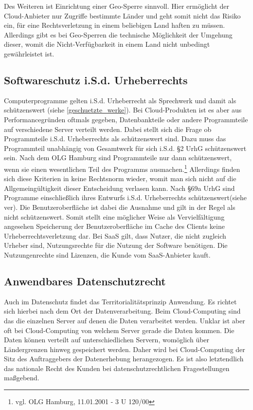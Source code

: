 Des Weiteren ist Einrichtung einer Geo-Sperre sinnvoll. Hier erm\"oglicht der Cloud-Anbieter nur Zugriffe bestimmte L\"ander und geht somit nicht das Risiko ein, f\"ur eine Rechtsverletzung in einem beliebigen Land haften zu m\"ussen. Allerdings gibt es bei Geo-Sperren die technische M\"oglichkeit der Umgehung dieser, womit die Nicht-Verf\"ugbarkeit in einem Land nicht unbedingt gew\"ahrleistet ist.

 \subsection{Softwareschutz i.S.d. Urheberrechts}
Computerprogramme gelten i.S.d. Urheberrecht als Sprechwerk und damit als sch\"utzenswert (siehe \vref{geschuetzte_werke}). Bei Cloud-Produkten ist es aber aus Performancegr\"unden oftmals gegeben, Datenbankteile oder andere Programmteile auf verschiedene Server verteilt werden. Dabei stellt sich die Frage ob Programmteile i.S.d. Urheberrechts als sch\"utzenswert sind. Dazu muss das Programmteil unabh\"angig von Gesamtwerk f\"ur sich i.S.d. §2 UrhG sch\"utzenswert sein. Nach dem OLG Hamburg sind Programmteile nur dann sch\"utzenswert, wenn sie einen wesentlichen Teil des Programms ausmachen.\footnote{vgl. OLG Hamburg, 11.01.2001 - 3 U 120/00} Allerdings finden sich diese Kriterien in keine Rechtsnorm wieder, womit man sich nicht auf die Allgemeing\"ultigkeit dieser Entscheidung verlasen kann.\newline
Nach §69a UrhG sind Programme einschlie{\ss}lich ihres Entwurfs i.S.d. Urheberrechts sch\"utzenswert(siehe {ver}). Die Benutzeroberfl\"ache ist dabei die Ausnahme und gilt in der Regel als nicht sch\"utzenswert. Somit stellt eine m\"oglicher Weise als Vervielf\"altigung angesehen Speicherung der Benutzeroberfl\"ache im Cache des Clients keine Urheberrechtsverletzung dar.\newline
Bei SaaS gilt, dass Nutzer, die nicht zugleich Urheber sind, Nutzungsrechte f\"ur die Nutzung der Software ben\"otigen. Die Nutzungenrechte sind Lizenzen, die Kunde vom SaaS-Anbieter kauft.   

    \subsection{Anwendbares Datenschutzrecht}
Auch im Datenschutz findet das Territorialit\"atsprinzip Anwendung. Es richtet sich hierbei nach dem Ort der Datenverarbeitung. Beim Cloud-Computing sind das die einzelnen Server auf denen die Daten verarbeitet werden. Unklar ist aber oft bei Cloud-Computing von welchem Server gerade die Daten kommen. Die Daten k\"onnen verteilt auf unterschiedlichen Servern, wom\"oglich \"uber L\"andergrenzen hinweg gespeichert werden. Daher wird bei Cloud-Computing der Sitz des Auftraggebers der Datenerhebung herangezogen. Es ist also letztendlich das nationale Recht des Kunden bei datenschutzrechtlichen Fragestellungen ma{\ss}gebend.

